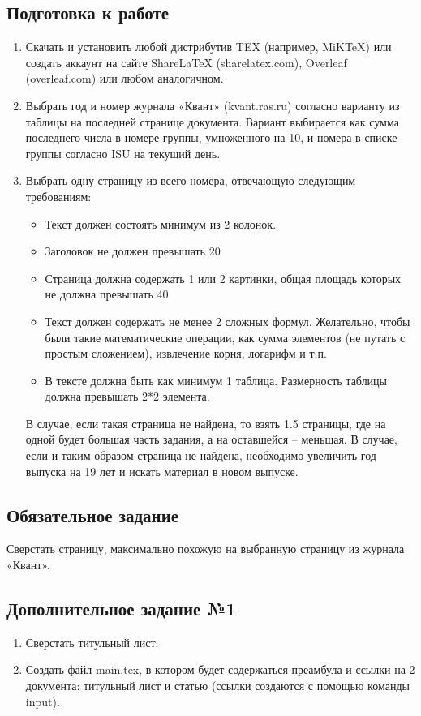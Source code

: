 \documentclass[a4paper]{article}
\begin{document}
	\subsection{Подготовка к работе}
		\begin{enumerate}[label=\arabic*.]
			\item Скачать и установить любой дистрибутив TEX (например, MiKTeX) или создать
			аккаунт на сайте ShareLaTeX (sharelatex.com), Overleaf (overleaf.com) или
			любом аналогичном.
			\item Выбрать год и номер журнала «Квант» (kvant.ras.ru) согласно варианту из
			таблицы на последней странице документа. Вариант выбирается как сумма
			после\-днего числа в номере группы, умноженного на 10, и номера в списке
			группы согласно ISU на текущий день.
			\item Выбрать одну страницу из всего номера, отвечающую следующим требованиям:
			\begin{itemize}
				\item Текст должен состоять минимум из 2 колонок.
				\item Заголовок не должен превышать 20%
				\item Страница должна содержать 1 или 2 картинки, общая площадь которых
				не должна превышать 40%
				\item Текст должен содержать не менее 2 сложных формул. Желательно, чтобы
				были такие математические операции, как сумма элементов (не путать с
				простым сложением), извлечение корня, логарифм и т.п.
				\item В тексте должна быть как минимум 1 таблица. Размерность таблицы
				должна превышать 2*2 элемента.
			\end{itemize}
			В случае, если такая страница не найдена, то взять 1.5 страницы, где на одной
			будет большая часть задания, а на оставшейся – меньшая.
			В случае, если и таким образом страница не найдена, необходимо увеличить
			год выпуска на 19 лет и искать материал в новом выпуске.
		\end{enumerate}
	\subsection{Обязательное задание}
		Сверстать страницу, максимально похожую на выбранную страницу из журнала
		«Квант».
	\subsection{Дополнительное задание №1}
		\begin{enumerate}[label=\arabic*.]
			\item Сверстать титульный лист.
			\item Создать файл main.tex, в котором будет содержаться преамбула и ссылки на 2
			документа: титульный лист и статью (ссылки создаются с помощью команды
			input).
		\end{enumerate}
\end{document}
